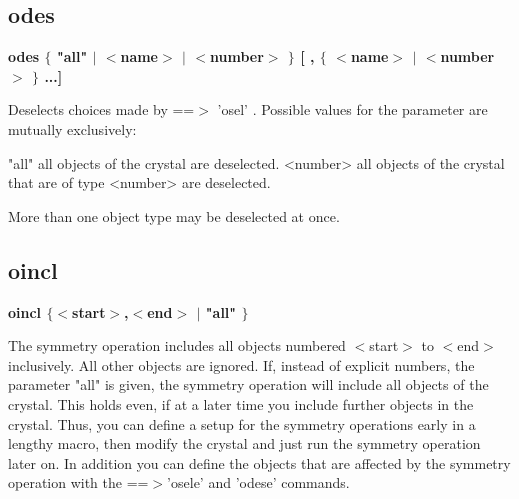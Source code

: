 \subsection*{odes}
{\bf odes $ \{$ "all" $| $ $ <$name$> $ $| $ $ <$number$> $ $\} $ [ , $ \{$ $ <$name$> $ $| $ $ <$number$> $ $\} $ ...] \par }
\par
\vspace{3pt}
Deselects choices made by ==$> $ 'osel' . Possible values 
for the parameter are mutually exclusively: 
\par
\begin{MacVerbatim}
"all"     all objects of the crystal are deselected.
<number>  all objects of the crystal that are of type <number>
          are deselected.
\end{MacVerbatim}
More than one object type may be deselected at once. 
\subsection*{oincl}
{\bf oincl $ \{$$ <$start$> $,$ <$end$> $ $| $ "all" $\} $ \par }
\par
\vspace{3pt}
The symmetry operation includes all objects numbered $ <$start$> $ to $ <$end$> $ 
inclusively. All other objects are ignored. 
If, instead of explicit numbers, the parameter "all" is given, the 
symmetry operation will include all objects of the crystal. This holds 
even, if at a later time you include further objects in the crystal. 
Thus, you can define a setup for the symmetry operations early in a 
lengthy macro, then modify the crystal and just run the symmetry 
operation later on. 
In addition you can define the objects that are affected by the 
symmetry operation with the ==$> $'osele' and 'odese' commands. 
